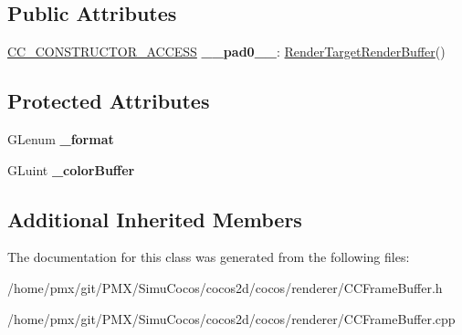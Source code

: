 \subsection*{Public Attributes}
\begin{DoxyCompactItemize}
\item 
\mbox{\label{classexperimental_1_1RenderTargetRenderBuffer_af3678efda51b3216f46287bb8aa8e6a6}} 
\hyperlink{_2cocos2d_2cocos_2base_2ccConfig_8h_a25ef1314f97c35a2ed3d029b0ead6da0}{C\+C\+\_\+\+C\+O\+N\+S\+T\+R\+U\+C\+T\+O\+R\+\_\+\+A\+C\+C\+E\+SS} {\bfseries \+\_\+\+\_\+pad0\+\_\+\+\_\+}\+: \hyperlink{classexperimental_1_1RenderTargetRenderBuffer}{Render\+Target\+Render\+Buffer}()
\end{DoxyCompactItemize}
\subsection*{Protected Attributes}
\begin{DoxyCompactItemize}
\item 
\mbox{\label{classexperimental_1_1RenderTargetRenderBuffer_a2f76bfccf4278248ed975c8701dcc4f0}} 
G\+Lenum {\bfseries \+\_\+format}
\item 
\mbox{\label{classexperimental_1_1RenderTargetRenderBuffer_a34f7c9f71322108bebbd9e1e5daf9bc5}} 
G\+Luint {\bfseries \+\_\+color\+Buffer}
\end{DoxyCompactItemize}
\subsection*{Additional Inherited Members}


The documentation for this class was generated from the following files\+:\begin{DoxyCompactItemize}
\item 
/home/pmx/git/\+P\+M\+X/\+Simu\+Cocos/cocos2d/cocos/renderer/C\+C\+Frame\+Buffer.\+h\item 
/home/pmx/git/\+P\+M\+X/\+Simu\+Cocos/cocos2d/cocos/renderer/C\+C\+Frame\+Buffer.\+cpp\end{DoxyCompactItemize}
